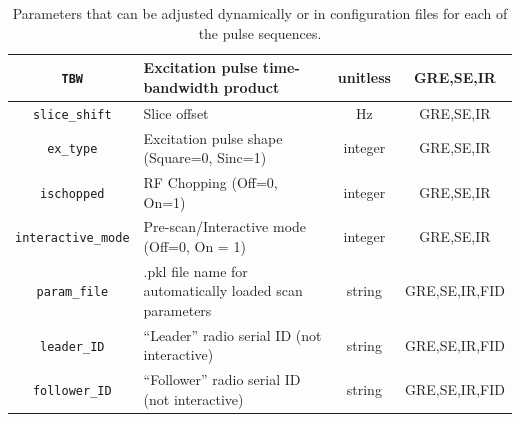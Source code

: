 \documentclass[10pt,letterpaper]{article}
\begin{document}
\begin{table}
\begin{tabularx}{\textwidth}{|c|X|c|c|}
	\texttt{TBW} & Excitation pulse time-bandwidth product & unitless & GRE,SE,IR\\ \hline
	\texttt{slice\_shift} & Slice offset & Hz & GRE,SE,IR\\ \hline
	\texttt{ex\_type} & Excitation pulse shape (Square=0, Sinc=1) & integer & GRE,SE,IR\\ \hline
	\texttt{ischopped} & RF Chopping (Off=0, On=1) & integer & GRE,SE,IR\\ \hline
	\texttt{interactive\_mode} & Pre-scan/Interactive mode (Off=0, On = 1) & integer & GRE,SE,IR\\ \hline
	\texttt{param\_file} & .pkl file name for automatically loaded scan parameters & string & GRE,SE,IR,FID\\ \hline
	\texttt{leader\_ID} & ``Leader'' radio serial ID (not interactive) & string & GRE,SE,IR,FID\\ \hline
	\texttt{follower\_ID} & ``Follower'' radio serial ID (not interactive) & string & GRE,SE,IR,FID\\ \hline
	
\end{tabularx}
\caption{Parameters that can be adjusted dynamically or in configuration files for each of the pulse sequences.}
\label{table:sequenceparams}
\end{table}
\end{document}
